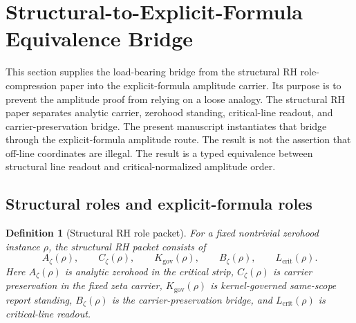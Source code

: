 \documentclass[11pt]{article}
\newtheorem{definition}{Definition}[section]
\newcommand{\Az}{A_{\zeta}}
\newcommand{\Lcrit}{L_{\mathrm{crit}}}
\newcommand{\Czeta}{C_{\zeta}}
\newcommand{\Kgov}{K_{\mathrm{gov}}}
\begin{document}
\section{Structural-to-Explicit-Formula Equivalence Bridge}\label{sec:structural-ef-bridge}

This section supplies the load-bearing bridge from the structural RH role-compression paper into the explicit-formula amplitude carrier.  Its purpose is to prevent the amplitude proof from relying on a loose analogy.  The structural RH paper separates analytic carrier, zerohood standing, critical-line readout, and carrier-preservation bridge.  The present manuscript instantiates that bridge through the explicit-formula amplitude route.  The result is not the assertion that off-line coordinates are illegal.  The result is a typed equivalence between structural line readout and critical-normalized amplitude order.

\subsection{Structural roles and explicit-formula roles}

\begin{definition}[Structural RH role packet]
For a fixed nontrivial zerohood instance \(\rho\), the structural RH packet consists of
\[
\Az(\rho),\qquad \Czeta(\rho),\qquad \Kgov(\rho),\qquad B_\zeta(\rho),\qquad \Lcrit(\rho).
\]
Here \(\Az(\rho)\) is analytic zerohood in the critical strip, \(\Czeta(\rho)\) is carrier preservation in the fixed zeta carrier, \(\Kgov(\rho)\) is kernel-governed same-scope report standing, \(B_\zeta(\rho)\) is the carrier-preservation bridge, and \(\Lcrit(\rho)\) is critical-line readout.
\end{definition}
\end{document}
